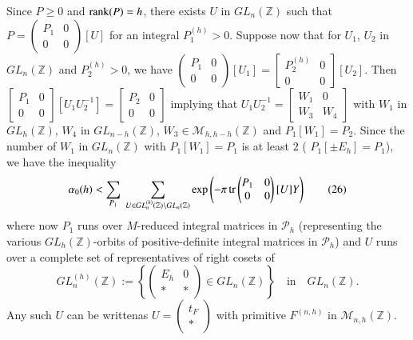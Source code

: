 Since $P\geq 0$ and $\operatorname{rank}(P)=h$, there exists $U$ in
$GL_{n}(\mathbb{Z})$ such that $P=\left(\begin{smallmatrix} P_{1} &
  0\\ 0 & 0\end{smallmatrix}\right)[U]$ for an integral
  $P^{(h)}_{1}>0$. Suppose now that for $U_{1}$, $U_{2}$ in
  $GL_{n}(\mathbb{Z})$ and $P^{(h)}_{2}>0$, we have
  $\left(\begin{smallmatrix} P_{1} & 0\\ 0 & 0
  \end{smallmatrix}\right)[U_{1}]=\left[\begin{smallmatrix}
      P^{(h)}_{2} & 0\\ 0 & 0
    \end{smallmatrix}\right][U_{2}]$. Then $\left[\begin{smallmatrix}
      P_{1} & 0\\ 0 &
      0    \end{smallmatrix}\right][U_{1}U^{-1}_{2}]=\left[\begin{smallmatrix}
      P_{2} & 0\\ 0 & 0    \end{smallmatrix}\right]$ implying that
  $U_{1}U^{-1}_{2}=\left[\begin{smallmatrix} W_{1} & 0\\ W_{3} & W_{4}
    \end{smallmatrix}\right]$ with $W_{1}$ in $GL_{h}(\mathbb{Z})$,
  $W_{4}$ in $GL_{n-h}(\mathbb{Z})$,
  $W_{3}\in\mathscr{M}_{h,h-h}(\mathbb{Z})$ and
  $P_{1}[W_{1}]=P_{2}$. Since the number of $W_{1}$ in
  $GL_{n}(\mathbb{Z})$ with $P_{1}[W_{1}]=P_{1}$ is at least $2$ (\eg
  $P_{1}[\pm E_{h}]=P_{1}$), we have the inequality
\begin{equation*}
\alpha_{0}(h)<\sum_{P_{1}} \; \sum_{U\in
  GL_{n}^{(h)} (\mathbb{Z})\backslash GL_{n}(\mathbb{Z})} \exp\left(-\pi
\operatorname{tr}
\begin{pmatrix} 
P_{1} & 0\\ 
0 & 0
\end{pmatrix}
[U]Y\right)\tag{26}\label{c1:eq26}
\end{equation*}
where now $P_{1}$ runs over $M$-reduced integral matrices in
$\mathscr{P}_{h}$ (representing the various
$GL_{h}(\mathbb{Z})$-orbits of positive-definite integral matrices in
$\mathscr{P}_{h}$) and $U$ runs over a complete set of representatives
of right cosets of 
$$
GL^{(h)}_{n}(\mathbb{Z}):=
\left\{
\begin{pmatrix}
E_{h} & 0\\
\ast & \ast
\end{pmatrix}
\in GL_{n}(\mathbb{Z})
\right\}\quad\text{in}\quad GL_{n}(\mathbb{Z}).
$$
Any such $U$ can be written\pageoriginale as
$U=\left(\begin{smallmatrix} t_{F}\\ \ast 
\end{smallmatrix}\right)$ with primitive $F^{(n,h)}$ in
$\mathscr{M}_{n,h}(\mathbb{Z})$. 

